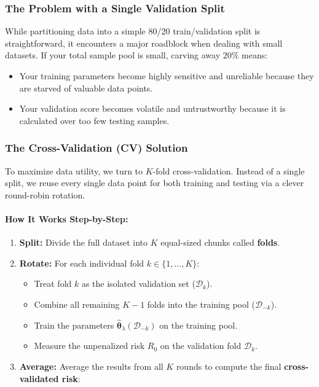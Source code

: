 \documentclass{article}
\begin{document}
\subsubsection{The Problem with a Single Validation Split}
While partitioning data into a simple 80/20 train/validation split is straightforward, it encounters a major roadblock when dealing with small datasets. If your total sample pool is small, carving away $20\%$ means:
\begin{itemize}
    \item Your training parameters become highly sensitive and unreliable because they are starved of valuable data points.
    \item Your validation score becomes volatile and untrustworthy because it is calculated over too few testing samples.
\end{itemize}

\subsubsection{The Cross-Validation (CV) Solution}
To maximize data utility, we turn to $K$-fold cross-validation. Instead of a single split, we reuse every single data point for both training and testing via a clever round-robin rotation.

\paragraph{How It Works Step-by-Step:}
\begin{enumerate}
    \item \textbf{Split:} Divide the full dataset into $K$ equal-sized chunks called \textbf{folds}.
    \item \textbf{Rotate:} For each individual fold $k \in \{1, \dots, K\}$:
    \begin{itemize}
        \item Treat fold $k$ as the isolated validation set ($\mathcal{D}_k$).
        \item Combine all remaining $K-1$ folds into the training pool ($\mathcal{D}_{-k}$).
        \item Train the parameters $\hat{\boldsymbol{\theta}}_\lambda(\mathcal{D}_{-k})$ on the training pool.
        \item Measure the unpenalized risk $R_0$ on the validation fold $\mathcal{D}_k$.
    \end{itemize}
    \item \textbf{Average:} Average the results from all $K$ rounds to compute the final \textbf{cross-validated risk}:
\end{enumerate}
\end{document}
